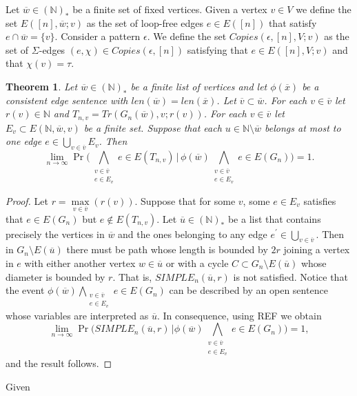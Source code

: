 \documentclass[12pt,notitlepage,a4paper]{article}
\newtheorem{theorem}{Theorem}[section]
\theoremstyle{definition}
\newcommand{\N}{\mathbb{N}}
\newcommand{\Ln}{\lim\limits_{n\to \infty}}
\begin{document}
	
	Let $\overline{w} \in (\N)_*$ be a finite set of fixed vertices.
	Given a vertex $v\in V$ we define the set $E([n], \overline{w};v)$
	as the set of loop-free edges $e\in E([n])$ that satisfy $e\cap \overline{w}=\{v\}$.
	Consider a pattern $\epsilon$. We define the set
	$Copies(\epsilon, [n], V;v)$ as the set of $\Sigma$-edges 
	$(e,\chi)\in Copies(\epsilon, [n])$ satisfying that 
	$e\in E([n], V;v)$ and that $\chi(v)=\tau$.	\par

	\begin{theorem}
		Let $\overline{w}\in (\N)_*$ be a finite list
		of vertices and let $\phi(\overline{x})$ be a consistent
		edge sentence with $len(\overline{w})=len(\overline{x})$.
		Let	$\overline{v}\subset \overline{w}$. For each 
		$v\in \overline{v}$ let $r(v)\in \N$
		and $T_{n,v}=Tr(G_n(\overline{w}),v;r(v))$.
		For each $v\in \overline{v}$ let 
		$E_v\subset E(\N,\overline{w},v)$ be a finite set. Suppose
		that each $u\in \N \setminus \overline{w}$
		belongs at most to one edge $e\in 
		\bigcup_{v\in \overline{v} } E_v$.
		Then
		\[
		\Ln \Pr\big( \bigwedge_{\substack{v\in \overline{v}\\
		e\in E_v}} e\in E(T_{n,v}) \, \big| \,
		\phi(\overline{w})
		\bigwedge_{\substack{v\in \overline{v}\\
		e\in E_v}} e\in E(G_n)	\big)=1.	
		\]
		
	\end{theorem}
	\begin{proof}
		Let $r=\max\limits_{v\in \overline{v}}(r(v))$. Suppose that
		for some $v$, some $e\in E_v$ satisfies that
		$e\in E(G_n)$ but $e\notin E(T_{n,v})$. Let
		$\overline{u}\in (\N)_*$ be a list that contains precisely 
		the vertices in $\overline{w}$ and the ones belonging to any
		edge $e^\prime\in \bigcup_{v\in \overline{v}}$. Then
		in $G_n\setminus E(\overline{u})$ there must be path
		whose length is bounded by $2r$ joining
		a vertex in $e$ with either another vertex $w\in \overline{u}$
		or with a cycle $C \subset G_n\setminus E(\overline{u})$ whose
		diameter is bounded by $r$. That is, $SIMPLE_n(\overline{u},r)$
		is not satisfied. Notice that the event $\phi(\overline{w}) 
		\bigwedge_{\substack{v\in \overline{v}\\e\in E_v}} e\in E(G_n)$ 
		can be described by an open sentence whose variables are interpreted as $\overline{u}$. 
		In consequence, using REF we obtain
		\[
		\Ln \Pr\big( SIMPLE_n(\overline{u},r) \, \big|
		\phi(\overline{w}) \bigwedge_{\substack{v\in \overline{v}\\
		e\in E_v}} e\in E(G_n) \big)=1,
		\]
		and the result follows. 
	\end{proof}
	Given
\end{document}

